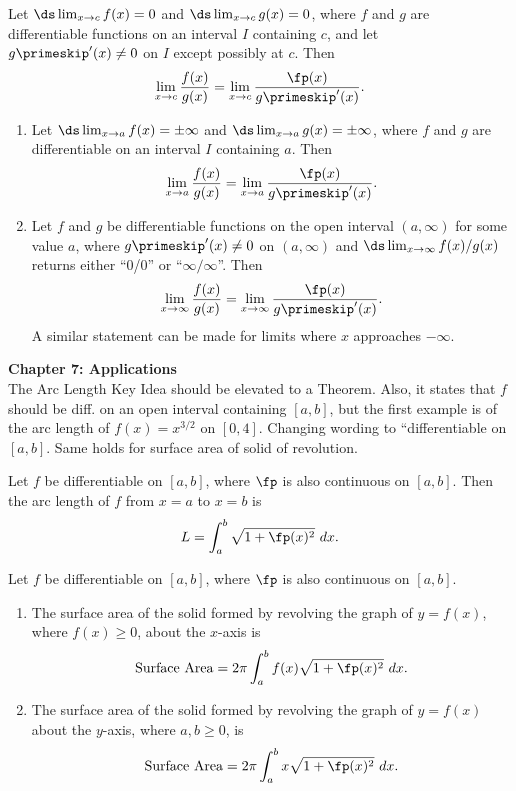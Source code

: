 \documentclass{article}
\begin{document}
{Let $\ds \lim_{x\to c}f(x) = 0$ and $\ds \lim_{x\to c}g(x)=0$, where $f$ and $g$ are differentiable functions on an interval $I$ containing $c$, and let $g\primeskip'(x)\neq 0$ on $I$ except possibly at $c$. Then 
$$ \lim_{x\to c} \frac{f(x)}{g(x)} = \lim_{x\to c} \frac{\fp(x)}{g\primeskip'(x)}.$$
}

{\begin{enumerate}
\item		Let $\ds\lim_{x\to a}f(x) = \pm\infty$ and $\ds\lim_{x\to a}g(x)=\pm \infty$, where $f$ and $g$ are differentiable on an interval $I$ containing $a$. Then 
$$\lim_{x\to a} \frac{f(x)}{g(x)} = \lim_{x\to a}\frac{\fp(x)}{g\primeskip'(x)}.$$

\item		Let $f$ and $g$ be differentiable functions on the open interval $(a,\infty)$ for some value $a$, where $g\primeskip'(x)\neq 0$ on $(a,\infty)$ and $\ds\lim_{x\to\infty} f(x)/g(x)$ returns either ``0/0'' or ``$\infty/\infty$''. Then
$$\lim_{x\to \infty} \frac{f(x)}{g(x)} = \lim_{x\to \infty}\frac{\fp(x)}{g\primeskip'(x)}.$$
A similar statement can be made for limits where $x$ approaches $-\infty$.
\end{enumerate}
}

\noindent\large\textbf{Chapter 7: Applications}\normalsize\\


The Arc Length Key Idea should be elevated to a Theorem. Also, it states that $f$ should be diff. on an open interval containing $[a,b]$, but the first example is of the arc length of $f(x) = x^{3/2}$ on $[0,4]$. Changing wording to ``differentiable on $[a,b]$. Same holds for surface area of solid of revolution.

{Let $f$ be differentiable on $[a,b]$, where $\fp$ is also continuous on $[a,b]$. Then the arc length of $f$ from $x=a$ to $x=b$ is
$$L = \int_a^b \sqrt{1+\fp(x)^2}\ dx.$$
}

{Let $f$ be differentiable on  $[a,b]$, where $\fp$ is also continuous on $[a,b]$. 
	\begin{enumerate}
	\item	The surface area of the solid formed by revolving the graph of $y=f(x)$, where $f(x)\geq0$, about the $x$-axis is
	$$\text{Surface Area} = 2\pi\int_a^b f(x)\sqrt{1+\fp(x)^2}\ dx.$$
	\item	The surface area of the solid formed by revolving the graph of $y=f(x)$ about the $y$-axis, where $a,b\geq0$, is
	$$\text{Surface Area} = 2\pi\int_a^b x\sqrt{1+\fp(x)^2}\ dx.$$
	\end{enumerate}
}
\end{document}
